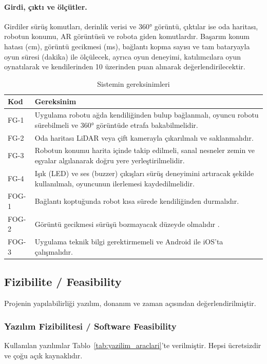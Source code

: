 \documentclass[11pt,a4paper]{article}
\begin{document}
\paragraph{Girdi, çıktı ve ölçütler.}
Girdiler sürüş komutları, derinlik verisi ve 360° görüntü, çıktılar ise oda haritası, robotun konumu, AR görüntüsü ve robota giden komutlardır. Başarım konum hatası (cm), görüntü gecikmesi (ms), bağlantı kopma sayısı ve tam bataryayla oyun süresi (dakika) ile ölçülecek, ayrıca oyun deneyimi, katılımcılara oyun oynatılarak ve kendilerinden 10 üzerinden puan alınarak değerlendirilecektir.

\begin{table}[H]
\centering
\caption{Sistemin gereksinimleri}
\label{tab:gereksinimler}
\small
\begin{tabularx}{\linewidth}{l >{\raggedright\arraybackslash}X}
\toprule
\textbf{Kod} & \textbf{Gereksinim} \\
\midrule
FG-1 & Uygulama robotu ağda kendiliğinden bulup bağlanmalı, oyuncu robotu sürebilmeli ve 360° görüntüde etrafa bakabilmelidir. \\
FG-2 & Oda haritası LiDAR veya çift kamerayla çıkarılmalı ve saklanmalıdır. \\
FG-3 & Robotun konumu harita içinde takip edilmeli, sanal nesneler zemin ve eşyalar algılanarak doğru yere yerleştirilmelidir. \\
FG-4 & Işık (LED) ve ses (buzzer) çıkışları sürüş deneyimini artıracak şekilde kullanılmalı, oyuncunun ilerlemesi kaydedilmelidir. \\
FOG-1 & Bağlantı koptuğunda robot kısa sürede kendiliğinden durmalıdır. \\
FOG-2 & Görüntü gecikmesi sürüşü bozmayacak düzeyde olmalıdır \cite{tang2026lowlatency}. \\
FOG-3 & Uygulama teknik bilgi gerektirmemeli ve Android ile iOS'ta çalışmalıdır. \\
\bottomrule
\end{tabularx}
\end{table}

\subsection{Fizibilite / Feasibility}
\label{subsec:fizibilite}
Projenin yapılabilirliği yazılım, donanım ve zaman açısından değerlendirilmiştir.

\subsubsection{Yazılım Fizibilitesi / Software Feasibility}
\label{subsubsec:yazilim_fizibilitesi}
Kullanılan yazılımlar Tablo~\ref{tab:yazilim_araclari}'te verilmiştir. Hepsi ücretsizdir ve çoğu açık kaynaklıdır.
\end{document}
